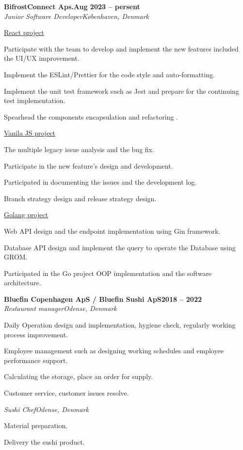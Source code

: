 \documentclass[a4paper]{article}
\newcommand{\heading}[2]{
\hspace{10pt}#1\hfill#2\\
}
\newcommand{\headingBf}[2]{
\heading{\textbf{#1}}{\textbf{#2}}
}
\newcommand{\headingIt}[2]{
\heading{\textit{#1}}{\textit{#2}}
}
\newenvironment{resume_list}{
\vspace{-7pt}
\begin{itemize}[itemsep=-2px, parsep=1pt, leftmargin=30pt]
}{
\end{itemize}
}
\newcommand{\itemTitle}[1]{
\item[] \underline{#1}\vspace{4pt}
}
\begin{document}
\headingBf{BifrostConnect Aps.}{Aug 2023 -- persent}
\headingIt{Junior Software Developer}{Københaven, Denmark}
\begin{resume_list}
\itemTitle{React project}
\item Participate with the team to develop and implement the new features included the UI/UX improvement.
\item Implement the ESLint/Prettier for the code style and auto-formatting.
\item Implement the unit test framework such as Jest and prepare for the continuing test implementation.
\item Spearhead the components encapsulation and refactoring .
\vspace{3pt}
\itemTitle{Vanila JS project}
\item The multiple legacy issue analysis and the bug fix.
\item Participate in the new feature's design and development.
\item Participated in documenting the issues and the development log.
\item Branch strategy design and release strategy design.
\vspace{3pt}
\itemTitle{Golang project}
\item Web API design and the endpoint implementation using Gin framework.
\item Database API design and implement the query to operate the Database using GROM. 
\item Participated in the Go project OOP implementation and the software architecture.
\end{resume_list}

\headingBf{Bluefin Copenhagen ApS / Bluefin Sushi ApS}{2018 -- 2022}
\headingIt{Restaurant manager}{Odense, Denmark}
\begin{resume_list}
\item Daily Operation design and implementation, hygiene check, regularly working process improvement.
\item Employee management such as designing working schedules and employee performance support.
\item Calculating the storage, place an order for supply.
\item Customer service, customer issues resolve.
\end{resume_list}
\headingIt{Sushi Chef}{Odense, Denmark}
\begin{resume_list}
\item Material preparation.
\item Delivery the sushi product.
\end{resume_list}
\end{document}
